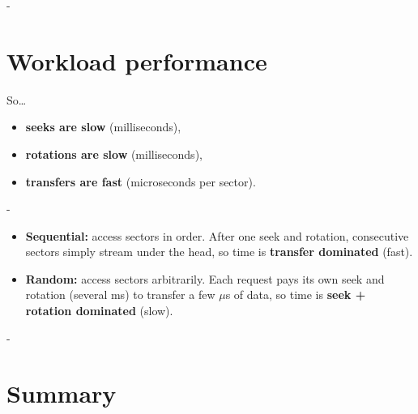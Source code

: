 \documentclass[11pt,a4paper]{article}
\makeatletter
\newcommand{\keepspace}[1]{\par\penalty-100\begingroup
  \setlength{\dimen@}{#1}\dimen@ii\pagegoal\advance\dimen@ii-\pagetotal
  \ifdim\dimen@>\dimen@ii\ifdim\dimen@ii>\z@\vfil\fi\break\fi\endgroup}
\makeatother
\begin{document}
\keepspace{10\baselineskip}
\section{Workload performance}

So\ldots
\begin{itemize}
  \item \textbf{seeks are slow} (milliseconds),
  \item \textbf{rotations are slow} (milliseconds),
  \item \textbf{transfers are fast} (microseconds per sector).
\end{itemize}

\keepspace{11\baselineskip}
\begin{quizbox}
\begin{itemize}
  \item \textbf{Sequential:} access sectors in order. After one seek and
        rotation, consecutive sectors simply stream under the head, so time
        is \textbf{transfer dominated} (fast).
  \item \textbf{Random:} access sectors arbitrarily. Each request pays its
        own seek and rotation (several ms) to transfer a few \(\mu\)s of
        data, so time is \textbf{seek + rotation dominated} (slow).
\end{itemize}
\end{quizbox}

\keepspace{20\baselineskip}
\section{Summary}
\end{document}
